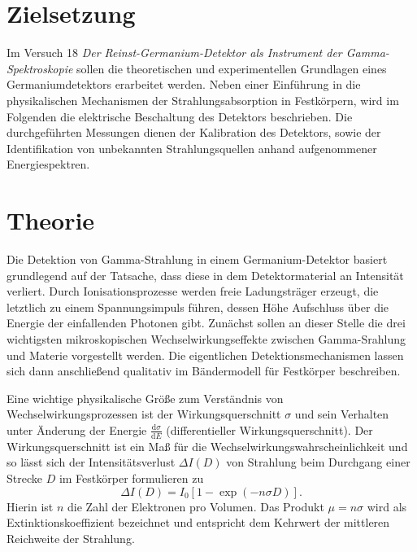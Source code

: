 \setcounter{page}{1}
\section*{Zielsetzung}
Im Versuch 18 \textit{Der Reinst-Germanium-Detektor als
Instrument der Gamma-Spektroskopie} sollen die theoretischen und experimentellen Grundlagen eines
Germaniumdetektors erarbeitet werden. Neben einer Einführung in die physikalischen Mechanismen der
Strahlungsabsorption in Festkörpern, wird im Folgenden die elektrische Beschaltung des Detektors beschrieben.
Die durchgeführten Messungen dienen der Kalibration des Detektors, sowie der Identifikation von unbekannten
Strahlungsquellen anhand aufgenommener Energiespektren.

\section{Theorie}
Die Detektion von Gamma-Strahlung in einem Germanium-Detektor basiert grundlegend auf der Tatsache, dass diese in dem
Detektormaterial an Intensität verliert. Durch Ionisationsprozesse werden freie Ladungsträger erzeugt, die letztlich
zu einem Spannungsimpuls führen, dessen Höhe Aufschluss über die Energie der einfallenden Photonen gibt.
Zunächst sollen an dieser Stelle die drei wichtigsten mikroskopischen Wechselwirkungseffekte zwischen Gamma-Srahlung und
Materie vorgestellt werden. Die eigentlichen Detektionsmechanismen lassen sich dann anschließend qualitativ im
Bändermodell für Festkörper beschreiben.

Eine wichtige physikalische
Größe zum Verständnis von Wechselwirkungsprozessen ist der Wirkungsquerschnitt $\sigma$ und sein Verhalten unter
Änderung der Energie $\frac{\mathup{d}\sigma}{\mathup{d}E}$ (differentieller Wirkungsquerschnitt). Der Wirkungsquerschnitt
ist ein Maß für die Wechselwirkungswahrscheinlichkeit und so lässt sich der Intensitätsverlust $\Delta I(D)$ von Strahlung beim Durchgang einer
Strecke $D$ im Festkörper formulieren zu
\begin{equation}
    \Delta I(D) = I_0 \left[1 -  \exp\left(- n \sigma D\right)\right].
\end{equation}
Hierin ist $n$ die Zahl der Elektronen pro Volumen. Das Produkt $\mu = n \sigma$ wird als Extinktionskoeffizient
bezeichnet und entspricht dem Kehrwert der mittleren Reichweite der Strahlung.


